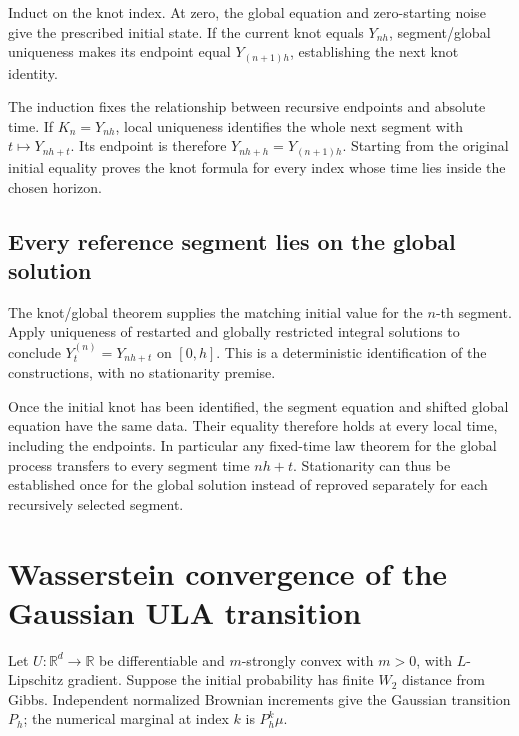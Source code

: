 \documentclass[11pt,a4paper]{article}
\begin{document}
Induct on the knot index. At zero, the global equation and zero-starting noise give the prescribed initial state. If the current knot equals \(Y_{nh}\), segment/\allowbreak{}global uniqueness makes its endpoint equal \(Y_{(n+1)h}\), establishing the next knot identity.



The induction fixes the relationship between recursive endpoints and absolute time. If \(K_n=Y_{nh}\), local uniqueness identifies the whole next segment with \(t\mapsto Y_{nh+t}\). Its endpoint is therefore \(Y_{nh+h}=Y_{(n+1)h}\). Starting from the original initial equality proves the knot formula for every index whose time lies inside the chosen horizon.


\subsection{\texorpdfstring{Every reference segment lies on the global solution}{Every reference segment lies on the global solution}}


The knot/\allowbreak{}global theorem supplies the matching initial value for the \(n\)-th segment. Apply uniqueness of restarted and globally restricted integral solutions to conclude \(Y^{(n)}_t=Y_{nh+t}\) on \([0,h]\). This is a deterministic identification of the constructions, with no stationarity premise.



Once the initial knot has been identified, the segment equation and shifted global equation have the same data. Their equality therefore holds at every local time, including the endpoints. In particular any fixed-time law theorem for the global process transfers to every segment time \(nh+t\). Stationarity can thus be established once for the global solution instead of reproved separately for each recursively selected segment.


\section{\texorpdfstring{Wasserstein convergence of the Gaussian ULA transition}{Wasserstein convergence of the Gaussian ULA transition}}


Let \(U:\mathbb R^d\to\mathbb R\) be differentiable and \(m\)-strongly convex with \(m>0\), with \(L\)-Lipschitz gradient. Suppose the initial probability has finite \(W_2\) distance from Gibbs. Independent normalized Brownian increments give the Gaussian transition \(P_h\); the numerical marginal at index \(k\) is \(P_h^k\mu\).
\end{document}
